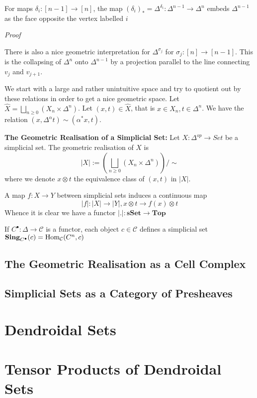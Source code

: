\begin{proposition}
    For maps $\delta_i: [n-1]\to[n]$, the map $(\delta_i)_* = \Delta^{\delta_i}: \Delta^{n-1}\to\Delta^n$ embeds $\Delta^{n-1}$ as the face opposite the vertex labelled $i$
\end{proposition}
\textit{Proof}

There is also a nice geometric interpretation for $\Delta^{\sigma_j}$ for $\sigma_j : [n] \to [n-1]$. This is the collapsing of $\Delta^n$ onto $\Delta^{n-1}$ by a projection parallel to the line connecting $v_j$ and $v_{j+1}$. 

We start with a large and rather unintuitive space and try to quotient out by these relations in order to get a nice geometric space. Let $\hat{X} = \bigsqcup_{n\geq 0}(X_n \times \Delta^n)$. Let $(x,t)\in \hat{X}$, that is $x\in X_n, t\in \Delta^n$. We have the relation $(x, \Delta^\alpha t) \sim (\alpha^* x, t)$.

\begin{definition}
    \textbf{The Geometric Realisation of a Simplicial Set: }Let $X:\Delta^{op}\to Set$ be a simplicial set. The geometric realisation of $X$ is
    \[|X|:= (\bigsqcup_{n\geq 0}(X_n \times \Delta^n))/\sim\]
    where we denote $x\otimes t$ the equivalence class of $(x,t)$ in $|X|$. 
\end{definition}
A map $f: X\to Y$ between simplicial sets induces a continuous map
\[|f|: |X| \to |Y|, x\otimes t \to f(x) \otimes t\]
Whence it is clear we have a functor $|.|: \textbf{sSet}\to \textbf{Top}$

If $C^\bullet: \Delta\to \mathcal{C}$ is a functor, each object $c\in \mathcal{C}$ defines a simplicial set $\textbf{Sing}_{C^\bullet}(c) = \text{Hom}_\mathcal{C}(C^n, c)$

\subsection{The Geometric Realisation as a Cell Complex}

\subsection{Simplicial Sets as a Category of Presheaves}

\section{Dendroidal Sets}

\section{Tensor Products of Dendroidal Sets}


